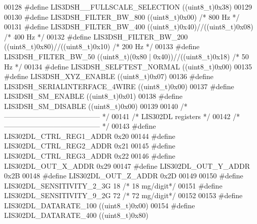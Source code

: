 \begin{DoxyCode}
00128 \textcolor{preprocessor}{#define LIS3DSH\_\_FULLSCALE\_SELECTION        ((uint8\_t)0x38)}
00129 
00130 \textcolor{preprocessor}{#define LIS3DSH\_FILTER\_BW\_800               ((uint8\_t)0x00)  }\textcolor{comment}{/* 800 Hz */}\textcolor{preprocessor}{}
00131 \textcolor{preprocessor}{#define LIS3DSH\_FILTER\_BW\_400               ((uint8\_t)0x40)//((uint8\_t)0x08) }\textcolor{comment}{/* 400 Hz  */}\textcolor{preprocessor}{}
00132 \textcolor{preprocessor}{#define LIS3DSH\_FILTER\_BW\_200               ((uint8\_t)0x80)//((uint8\_t)0x10)  }\textcolor{comment}{/* 200 Hz */}\textcolor{preprocessor}{}
00133 \textcolor{preprocessor}{#define LIS3DSH\_FILTER\_BW\_50                ((uint8\_t)(0x80 | 0x40))//((uint8\_t)0x18)  }\textcolor{comment}{/* 50 Hz  */}\textcolor{preprocessor}{}
00134 \textcolor{preprocessor}{#define LIS3DSH\_SELFTEST\_NORMAL             ((uint8\_t)0x00)}
00135 \textcolor{preprocessor}{#define LIS3DSH\_XYZ\_ENABLE                  ((uint8\_t)0x07)}
00136 \textcolor{preprocessor}{#define LIS3DSH\_SERIALINTERFACE\_4WIRE       ((uint8\_t)0x00)}
00137 \textcolor{preprocessor}{#define LIS3DSH\_SM\_ENABLE                   ((uint8\_t)0x01)}
00138 \textcolor{preprocessor}{#define LIS3DSH\_SM\_DISABLE                  ((uint8\_t)0x00)}
00139 
00140 \textcolor{comment}{/* ----------------------------------------- */}
00141 \textcolor{comment}{/* LIS302DL registers                        */}
00142 \textcolor{comment}{/* ----------------------------------------- */}
00143 \textcolor{preprocessor}{#define LIS302DL\_CTRL\_REG1\_ADDR                         0x20}
00144 \textcolor{preprocessor}{#define LIS302DL\_CTRL\_REG2\_ADDR                         0x21}
00145 \textcolor{preprocessor}{#define LIS302DL\_CTRL\_REG3\_ADDR                         0x22}
00146 \textcolor{preprocessor}{#define LIS302DL\_OUT\_X\_ADDR                             0x29}
00147 \textcolor{preprocessor}{#define LIS302DL\_OUT\_Y\_ADDR                             0x2B}
00148 \textcolor{preprocessor}{#define LIS302DL\_OUT\_Z\_ADDR                             0x2D}
00149 
00150 \textcolor{preprocessor}{#define LIS302DL\_SENSITIVITY\_2\_3G                       18  }\textcolor{comment}{/* 18 mg/digit*/}\textcolor{preprocessor}{}
00151 \textcolor{preprocessor}{#define LIS302DL\_SENSITIVITY\_9\_2G                       72  }\textcolor{comment}{/* 72 mg/digit*/}\textcolor{preprocessor}{}
00152 
00153 \textcolor{preprocessor}{#define LIS302DL\_DATARATE\_100                           ((uint8\_t)0x00)}
00154 \textcolor{preprocessor}{#define LIS302DL\_DATARATE\_400                           ((uint8\_t)0x80)}

\end{DoxyCode}
